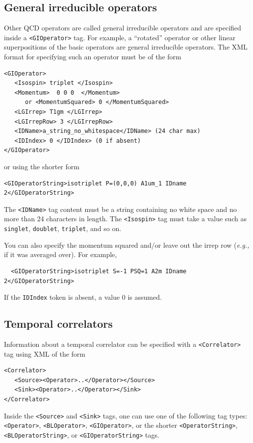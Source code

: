 \documentclass[12pt]{article}
\newcommand{\vb}{\texttt}
\begin{document}
\subsection{General irreducible operators}

Other QCD operators are called general irreducible operators
and are specified inside a \vb{<GIOperator>} tag. For example,
a ``rotated'' operator or other linear superpositions of the
basic operators are general irreducible operators.  The XML
format for specifying such an operator must be of the form
\begin{verbatim}
<GIOperator>
   <Isospin> triplet </Isospin>
   <Momentum>  0 0 0  </Momentum>
      or <MomentumSquared> 0 </MomentumSquared>
   <LGIrrep> T1gm </LGIrrep>
   <LGIrrepRow> 3 </LGIrrepRow>
   <IDName>a_string_no_whitespace</IDName> (24 char max)
   <IDIndex> 0 </IDIndex> (0 if absent)
</GIOperator>
\end{verbatim}
or using the shorter form
\begin{verbatim}
<GIOperatorString>isotriplet P=(0,0,0) A1um_1 IDname 2</GIOperatorString>
\end{verbatim}
The \vb{<IDName>} tag content must be a string containing no white space
and no more than 24 characters in length.  The \vb{<Isospin>} tag must take 
a value such as \vb{singlet}, \vb{doublet}, \vb{triplet}, and so on.

You can also specify the momentum squared and/or leave out the irrep row 
(\textit{e.g.,} if it was averaged over).  For example,
\begin{verbatim}
  <GIOperatorString>isotriplet S=-1 PSQ=1 A2m IDname 2</GIOperatorString>
\end{verbatim}
If the \vb{IDIndex} token is absent, a value 0 is assumed.

\subsection{Temporal correlators}

Information about a temporal correlator can be specified with a
\vb{<Correlator>} tag using XML of the form
\begin{verbatim}
<Correlator>
   <Source><Operator>..</Operator></Source>
   <Sink><Operator>..</Operator></Sink>
</Correlator>
\end{verbatim}
Inside the \vb{<Source>} and \vb{<Sink>} tags, one can use one of
the following tag types:
\vb{<Operator>}, \vb{<BLOperator>}, \vb{<GIOperator>}, or the shorter
\vb{<OperatorString>}, \vb{<BLOperatorString>}, or
\vb{<GIOperatorString>} tags.
\end{document}
